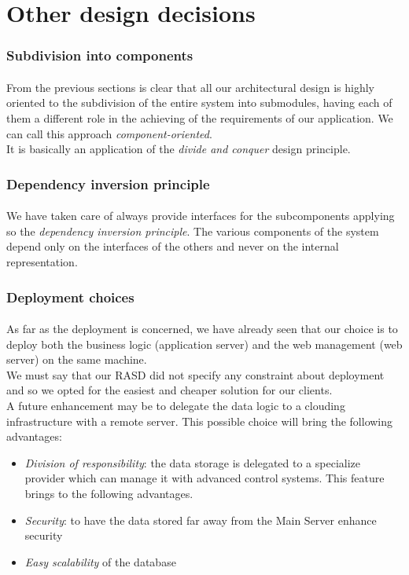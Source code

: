 \section{Other design decisions}
\subsubsection{Subdivision into components}
\paragraph{}From the previous sections is clear that all our architectural design is highly oriented to the subdivision of the entire system into submodules, having each of them a different role in the achieving of the requirements of our application. We can call this approach \textit{component-oriented}.\\
It is basically an application of the \textit{divide and conquer} design principle.

\subsubsection{Dependency inversion principle}
\paragraph{} We have taken care of always provide interfaces for the subcomponents applying so the \textit{dependency inversion principle}. The various components of the system depend only on the interfaces of the others and never on the internal representation.

\subsubsection{Deployment choices}
\paragraph{} As far as the deployment is concerned, we have already seen that our choice is to deploy both the business logic (application server) and the web management (web server) on the same machine.\\ We must say that our RASD did not specify any constraint about deployment and so we opted for the easiest and cheaper solution for our clients.\\ A future enhancement may be to delegate the data logic to a clouding infrastructure with a remote server. This possible choice will bring the following advantages:
\begin{itemize}
	\item \textit{Division of responsibility}: the data storage is delegated to a specialize provider which can manage it with advanced control systems. This feature brings to the following advantages.
	\item \textit{Security}: to have the data stored far away from the Main Server enhance security
	\item \textit{Easy scalability} of the database 
\end{itemize} 